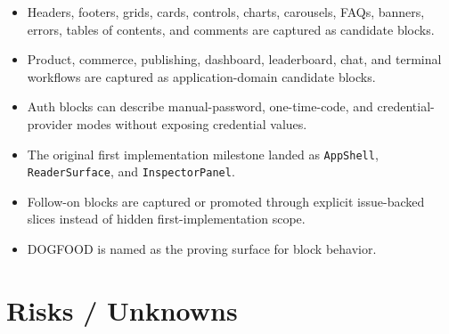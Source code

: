 \begin{itemize}
\item
  Headers, footers, grids, cards, controls, charts, carousels, FAQs, banners, errors, tables of contents, and comments are captured as candidate blocks.
\item
  Product, commerce, publishing, dashboard, leaderboard, chat, and terminal workflows are captured as application-domain candidate blocks.
\item
  Auth blocks can describe manual-password, one-time-code, and credential-provider modes without exposing credential values.
\item
  The original first implementation milestone landed as \texttt{A\allowbreak{}p\allowbreak{}p\allowbreak{}S\allowbreak{}h\allowbreak{}e\allowbreak{}l\allowbreak{}l}, \texttt{R\allowbreak{}e\allowbreak{}a\allowbreak{}d\allowbreak{}e\allowbreak{}r\allowbreak{}S\allowbreak{}u\allowbreak{}r\allowbreak{}f\allowbreak{}a\allowbreak{}c\allowbreak{}e}, and \texttt{I\allowbreak{}n\allowbreak{}s\allowbreak{}p\allowbreak{}e\allowbreak{}c\allowbreak{}t\allowbreak{}o\allowbreak{}r\allowbreak{}P\allowbreak{}a\allowbreak{}n\allowbreak{}e\allowbreak{}l}.
\item
  Follow-on blocks are captured or promoted through explicit issue-backed slices instead of hidden first-implementation scope.
\item
  DOGFOOD is named as the proving surface for block behavior.
\end{itemize}

\section{Risks / Unknowns}\label{record-128-risks-unknowns}

